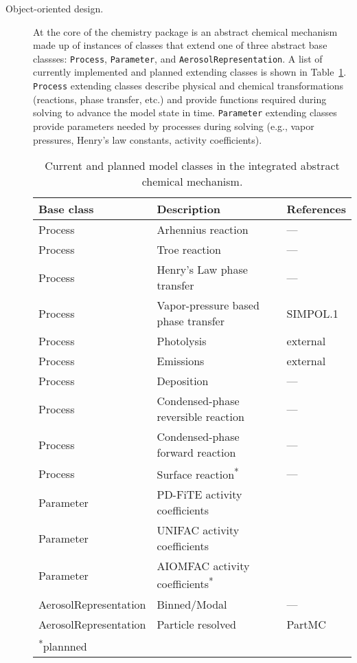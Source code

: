 \documentclass[11pt]{article}
\begin{document}
\begin{description}
\item [Object-oriented design.] At the core of the chemistry package is an
abstract chemical mechanism made up of instances of classes that extend one
of three abstract base classses: \texttt{Process},
\texttt{Parameter}, and \texttt{AerosolRepresentation}.
A list of currently implemented and
planned extending classes is shown in Table~\ref{tab:model_classes}.
\texttt{Process} extending classes describe physical and chemical
transformations (reactions, phase transfer, etc.) and provide functions
required during solving to advance the model state in time. \texttt{Parameter}
extending classes provide parameters needed by processes during solving
(e.g., vapor pressures, Henry's law constants, activity coefficients).

\begin{table}[]
\caption{Current and planned model classes in the integrated abstract chemical
         mechanism.}
\label{tab:model_classes}
\begin{tabular}{lll}
 \hline
 Base class & Description                                      & References \\
 \hline
 Process    & Arhennius reaction                               & --- \\
 Process    & Troe reaction                                    & --- \\
 Process    & Henry's Law phase transfer                       & --- \\
 Process    & Vapor-pressure based phase transfer              & SIMPOL.1 \citep{Pankow2008} \\
 Process    & Photolysis                                       & external \\
 Process    & Emissions                                        & external \\
 Process    & Deposition                                       & --- \\
 Process    & Condensed-phase reversible reaction              & --- \\
 Process    & Condensed-phase forward reaction                 & --- \\
 Process    & Surface reaction\textsuperscript{*}              & --- \\
 Parameter  & PD-FiTE activity coefficients                    & \cite{Topping2009} \\
 Parameter  & UNIFAC activity coefficients                     & \cite{Hansen1991} \\
 Parameter  & AIOMFAC activity coefficients\textsuperscript{*} & \cite{Zuend2008} \\
 AerosolRepresentation & Binned/Modal                          & --- \\
 AerosolRepresentation & Particle resolved                     & PartMC \citep{Riemer2009a} \\
 \hline
 \textsuperscript{*}plannned
\end{tabular}
\end{table}


\end{description}
\end{document}
